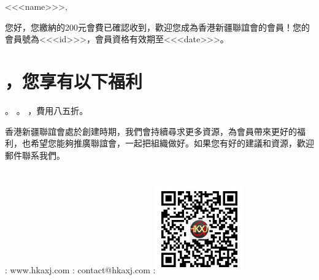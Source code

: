 \documentclass[11pt, oneside,margin=1in]{article}   	%
\newcommand{\chuhao}{\fontsize{14bp}{\baselineskip}}
\begin{document}
\begin{CJK}{UTF8}{bkai}


<<<name>>>,
\par
您好，您繳納的200元會費已確認收到，歡迎您成為香港新疆聯誼會的會員！您的會員號為<<<id>>>，會員資格有效期至<<<date>>>。

\section*{，您享有以下福利}
\begin{description}
。
。
，費用八五折。
\end{description}


香港新疆聯誼會處於創建時期，我們會持續尋求更多資源，為會員帶來更好的福利，也希望您能夠推廣聯誼會，一起把組織做好。如果您有好的建議和資源，歡迎郵件聯系我們。


\section*{}
\begin{center}
\begin{description}
: www.hkaxj.com
: contact@hkaxj.com
:\center \includegraphics[width=1.5in]{./res/qr.jpg} 
\end{description}
\end{center}

\end{CJK}
\end{document}
